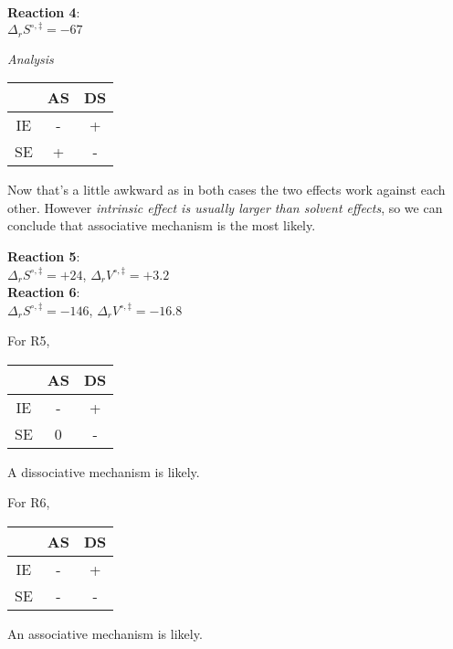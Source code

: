 \begin{infobox}[default]
  \textbf{Reaction 4}: \\
  $\Delta_rS^{\circ,\ddag}=-67$
\end{infobox}
\emph{Analysis}\\
\begin{center}
  \begin{tabular}{c|c|c}
   & AS & DS\\
   \hline
   IE & - & + \\
   \hline
   SE & + & -
  \end{tabular}
\end{center}
Now that's a little awkward as in both cases the two effects work against each other. However \emph{intrinsic effect is usually larger than solvent effects}, so we can conclude that associative mechanism is the most likely.
\begin{infobox}[default]
  \textbf{Reaction 5}: \\
  $\Delta_rS^{\circ,\ddag}=+24$, $\Delta_rV^{\circ,\ddag}=+3.2$\\
  \textbf{Reaction 6}: \\
  $\Delta_rS^{\circ,\ddag}=-146$, $\Delta_rV^{\circ,\ddag}=-16.8$
\end{infobox}
For R5, 
\begin{center}
  \begin{tabular}{c|c|c}
   & AS & DS\\
   \hline
   IE & - & + \\
   \hline
   SE & 0 & -
  \end{tabular}
\end{center}
A dissociative mechanism is likely.\par
For R6,
\begin{center}
  \begin{tabular}{c|c|c}
   & AS & DS\\
   \hline
   IE & - & + \\
   \hline
   SE & - & -
  \end{tabular}
\end{center}
An associative mechanism is likely.